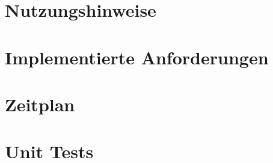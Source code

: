 \documentclass[parskip=full]{scrartcl}
\begin{document}
\section{Nutzungshinweise}

\pagebreak

\section{Implementierte Anforderungen}

\pagebreak

\section{Zeitplan}

\pagebreak

\section{Unit Tests}

\pagebreak
\end{document}
